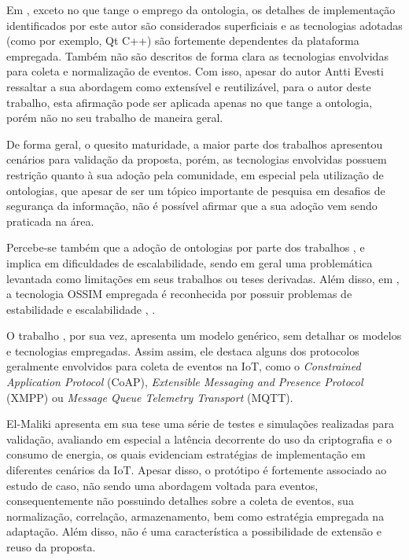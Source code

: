 \documentclass[tid,table]{texufpel} %
\begin{document}
Em \cite{evesti13c}, exceto no que tange o emprego da ontologia, os detalhes de implementação identificados por este autor são considerados superficiais e as tecnologias adotadas (como por exemplo, Qt C++) são fortemente dependentes da plataforma empregada. Também não são descritos de forma clara as tecnologias envolvidas para coleta e normalização de eventos. Com isso, apesar do autor Antti Evesti ressaltar a sua abordagem como extensível e reutilizável, para o autor deste trabalho, esta afirmação pode ser aplicada apenas no que tange a ontologia, porém não no seu trabalho de maneira geral.

De forma geral, o quesito maturidade, a maior parte dos trabalhos apresentou cenários para validação da proposta, porém, as tecnologias envolvidas possuem restrição quanto à sua adoção pela comunidade, em especial pela utilização de ontologias, que apesar de ser um tópico importante de pesquisa em desafios de segurança da informação, não é possível afirmar que a sua adoção vem sendo praticada na área.

Percebe-se também que a adoção de ontologias por parte dos trabalhos \cite{evesti13c}, \cite{aman14} e \cite{mozzaquatro16} implica em dificuldades de escalabilidade, sendo em geral uma problemática levantada como limitações em seus trabalhos ou teses derivadas. Além disso, em \cite{aman14}, a tecnologia OSSIM empregada é reconhecida por possuir problemas de estabilidade e escalabilidade \cite{gartner15}, \cite{infosecnirvana14}.

O trabalho \cite{ramos15}, por sua vez, apresenta um modelo genérico, sem detalhar os modelos e tecnologias empregadas. Assim assim, ele destaca alguns dos protocolos geralmente envolvidos para coleta de eventos na IoT, como o \textit{Constrained Application Protocol} (CoAP), \textit{Extensible Messaging and Presence Protocol} (XMPP) ou \textit{Message Queue Telemetry Transport} (MQTT).

El-Maliki apresenta em sua tese \cite{elmaliki14} uma série de testes e simulações realizadas para validação, avaliando em especial a latência decorrente do uso da criptografia e o consumo de energia, os quais evidenciam estratégias de implementação em diferentes cenários da IoT. Apesar disso, o protótipo é fortemente associado ao estudo de caso, não sendo uma abordagem voltada para eventos, consequentemente não possuindo detalhes sobre a coleta de eventos, sua normalização, correlação, armazenamento, bem como estratégia empregada na adaptação. Além disso, não é uma característica a possibilidade de extensão e reuso da proposta.
\end{document}
